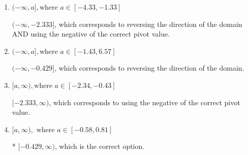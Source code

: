 \documentclass{extbook}[14pt]
\begin{document}
\begin{enumerate}
{\begin{enumerate}[label=\Alph*.]
This corresponds to the radical having an odd power, but the radical for this question is even.
\item \( (-\infty, a], \text{where } a \in [-4.33, -1.33] \)

$(-\infty, -2.333]$, which corresponds to reversing the direction of the domain AND using the negative of the correct pivot value.
\item \( (-\infty, a], \text{where } a \in [-1.43, 6.57] \)

 $(-\infty, -0.429]$, which corresponds to reversing the direction of the domain.
\item \( [a, \infty), \text{where } a \in [-2.34, -0.43] \)

$[-2.333, \infty)$, which corresponds to using the negative of the correct pivot value.
\item \( [a, \infty), \text{ where } a \in [-0.58, 0.81] \)

* $[-0.429, \infty)$, which is the correct option.
\end{enumerate}

}
\end{enumerate}
\end{document}
